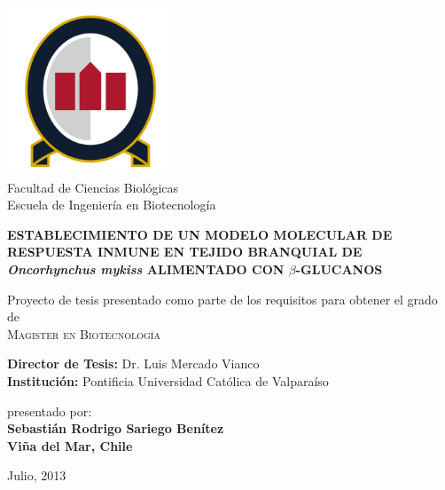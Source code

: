 \documentclass[12pt,a4paper,]{article}
\begin{document}
\begin{titlepage}
    \begin{center}
    
        
\includegraphics[width=5cm]{unab}\\
\vspace{0.1cm}
Facultad de Ciencias Biológicas\\
Escuela de Ingeniería en Biotecnología

        \vspace*{1cm}
        
       \large{ \textbf{ \uppercase{Establecimiento de un modelo molecular de respuesta inmune en tejido branquial de} \emph{Oncorhynchus mykiss} \uppercase{alimentado con $\beta$-glucanos}}}
        
        \vspace{0.5cm}
        
        \vspace{1.5cm}
 
        Proyecto de tesis presentado como parte de los requisitos para obtener el grado de \\
        \large{\textsc{Magister en Biotecnología}}\\ 
        
        \vspace{3cm}        
         
        \textbf{Director de Tesis:} Dr. Luis Mercado Vianco\\
        \textbf{Institución:} Pontificia Universidad Católica de Valparaíso       
       
       \vspace{0.8cm}          
        
             
        \vspace{0.5cm}     
        
        
         \vspace{2cm}
         presentado por:\\
         \vspace{0.1cm}
         \textbf{Sebastián Rodrigo Sariego Benítez}\\
         \textbf{Viña del Mar, Chile}
         
       

        
        
        \vfill
  
        Julio, 2013
        
 
 
     \end{center}
    \thispagestyle{empty}
\end{titlepage}
\end{document}

